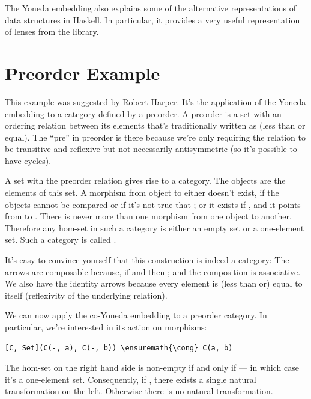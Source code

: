 The Yoneda embedding also explains some of the alternative
representations of data structures in Haskell. In particular, it
provides a very useful representation
of lenses from the  library.

\section{Preorder Example}\label{preorder-example}

This example was suggested by Robert Harper. It's the application of the
Yoneda embedding to a category defined by a preorder. A preorder is a
set with an ordering relation between its elements that's traditionally
written as \code{<=} (less than or equal). The ``pre'' in
preorder is there because we're only requiring the relation to be
transitive and reflexive but not necessarily antisymmetric (so it's
possible to have cycles).

A set with the preorder relation gives rise to a category. The objects
are the elements of this set. A morphism from object  to
 either doesn't exist, if the objects cannot be compared or if
it's not true that ; or it exists if
, and it points from  to
. There is never more than one morphism from one object to
another. Therefore any hom-set in such a category is either an empty set
or a one-element set. Such a category is called .

It's easy to convince yourself that this construction is indeed a
category: The arrows are composable because, if
 and  then
; and the composition is associative. We also
have the identity arrows because every element is (less than or) equal
to itself (reflexivity of the underlying relation).

We can now apply the co-Yoneda embedding to a preorder category. In
particular, we're interested in its action on morphisms:

\begin{Verbatim}[commandchars=\\\{\}]
[C, Set](C(-, a), C(-, b)) \ensuremath{\cong} C(a, b)
\end{Verbatim}
The hom-set on the right hand side is non-empty if and only if
 --- in which case it's a one-element set.
Consequently, if , there exists a single
natural transformation on the left. Otherwise there is no natural
transformation.

